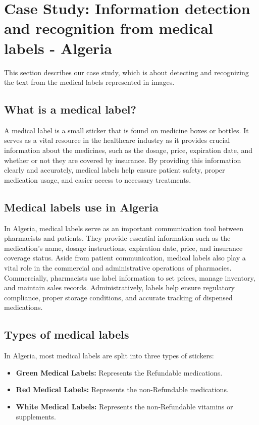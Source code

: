 \section{Case Study: Information detection and recognition from medical labels - Algeria}
This section describes our case study, which is about detecting and recognizing the text from the medical labels represented in images.

\subsection{What is a medical label?}
A medical label is a small sticker that is found on medicine boxes or bottles. It serves as a vital resource in the healthcare industry as it provides crucial information about the medicines, such as the dosage, price, expiration date, and whether or not they are covered by insurance. By providing this information clearly and accurately, medical labels help ensure patient safety, proper medication usage, and easier access to necessary treatments.%

\subsection{Medical labels use in Algeria}

In Algeria, medical labels serve as an important communication tool between pharmacists and patients. They provide essential information such as the medication's name, dosage instructions, expiration date, price, and insurance coverage status. Aside from patient communication, medical labels also play a vital role in the commercial and administrative operations of pharmacies. Commercially, pharmacists use label information to set prices, manage inventory, and maintain sales records. Administratively, labels help ensure regulatory compliance, proper storage conditions, and accurate tracking of dispensed medications. %

\subsection{Types of medical labels}
In Algeria, most medical labels are split into three types of stickers:
\begin{itemize}
    \item \textbf{Green Medical Labels:} Represents the Refundable medications.
    \item \textbf{Red Medical Labels:} Represents the non-Refundable medications.
    \item \textbf{White Medical Labels:} Represents the non-Refundable vitamins or supplements.
\end{itemize}
   

